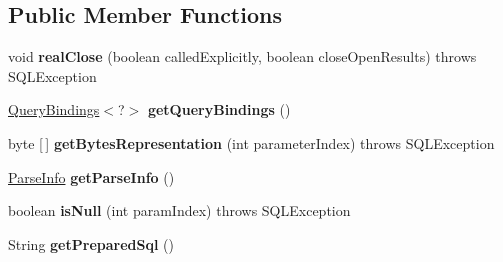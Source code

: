 \subsection*{Public Member Functions}
\begin{DoxyCompactItemize}
\item 
\mbox{\label{interfacecom_1_1mysql_1_1cj_1_1jdbc_1_1_jdbc_prepared_statement_a141eeee85d7c5f0b1a3cb6efbe2b052a}} 
void {\bfseries real\+Close} (boolean called\+Explicitly, boolean close\+Open\+Results)  throws S\+Q\+L\+Exception
\item 
\mbox{\label{interfacecom_1_1mysql_1_1cj_1_1jdbc_1_1_jdbc_prepared_statement_a1d95958c32c8174c267e3d91e7371a13}} 
\mbox{\hyperlink{interfacecom_1_1mysql_1_1cj_1_1_query_bindings}{Query\+Bindings}}$<$?$>$ {\bfseries get\+Query\+Bindings} ()
\item 
\mbox{\label{interfacecom_1_1mysql_1_1cj_1_1jdbc_1_1_jdbc_prepared_statement_ae8f9f48f17aec65c48330d444f0a3a5f}} 
byte \mbox{[}$\,$\mbox{]} {\bfseries get\+Bytes\+Representation} (int parameter\+Index)  throws S\+Q\+L\+Exception
\item 
\mbox{\label{interfacecom_1_1mysql_1_1cj_1_1jdbc_1_1_jdbc_prepared_statement_ac7a61028280256f1c0360f7cdfefa0e7}} 
\mbox{\hyperlink{classcom_1_1mysql_1_1cj_1_1_parse_info}{Parse\+Info}} {\bfseries get\+Parse\+Info} ()
\item 
\mbox{\label{interfacecom_1_1mysql_1_1cj_1_1jdbc_1_1_jdbc_prepared_statement_afdd7b92fa3a45b8643a7f992807b487a}} 
boolean {\bfseries is\+Null} (int param\+Index)  throws S\+Q\+L\+Exception
\item 
\mbox{\label{interfacecom_1_1mysql_1_1cj_1_1jdbc_1_1_jdbc_prepared_statement_a20618e9a216f90d8366fd7e931783dda}} 
String {\bfseries get\+Prepared\+Sql} ()
\item 
\mbox{\label{interfacecom_1_1mysql_1_1cj_1_1jdbc_1_1_jdbc_prepared_statement_ab355e6fcc10a4fae67e0425b76bc218f}} 

\end{DoxyCompactItemize}
